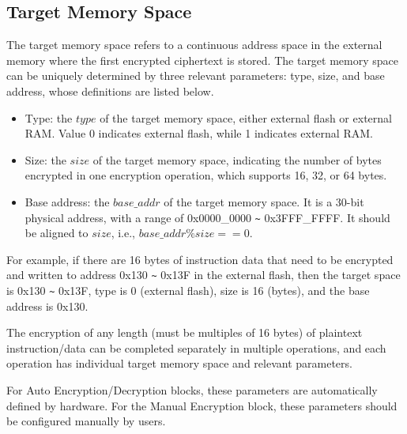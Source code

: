\documentclass[main\_\_EN.tex]{subfiles}
\begin{document}
\subsection{Target Memory Space}
\label{sec:extmemencr-target-space}

The target memory space refers to a continuous address space in the external memory where the first encrypted ciphertext is stored. The target memory space can be uniquely determined by three relevant parameters: type, size, and base address, whose definitions are listed below.

\begin{itemize}
    \item Type: the \begin{math} type \end{math} of the target memory space, either external flash or external RAM. Value 0 indicates external flash, while 1 indicates external RAM.
    \item Size: the \begin{math} size \end{math} of the target memory space, indicating the number of bytes encrypted in one encryption operation, which supports 16, 32, or 64 bytes.
    \item Base address: the \begin{math} base\_addr\end{math} of the target memory space. It is a 30-bit physical address, with a range of 0x0000\_0000 \verb+~+ 0x3FFF\_FFFF. It should be aligned to \begin{math} size \end{math}, i.e., \begin{math} base\_addr \% size == 0 \end{math}.
\end{itemize}

For example, if there are 16 bytes of instruction data that need to be encrypted and written to address 0x130 \verb+~+ 0x13F in the external flash, then the target space is 0x130 \verb+~+ 0x13F, type is 0 (external flash), size is 16 (bytes), and the base address is 0x130.

The encryption of any length (must be multiples of 16 bytes) of plaintext instruction/data can be completed separately in multiple operations, and each operation has individual target memory space and relevant parameters.

For Auto Encryption/Decryption blocks, these parameters are automatically defined by hardware. For the Manual Encryption block, these parameters should be configured manually by users.
\end{document}
